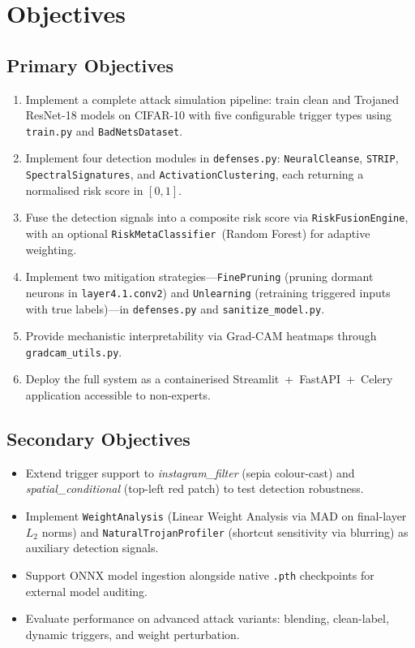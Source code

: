 \documentclass[12pt, letterpaper]{article}
\begin{document}
\section{Objectives}
\label{sec:objectives}

\subsection{Primary Objectives}

\begin{enumerate}
  \item Implement a complete attack simulation pipeline: train clean and
        Trojaned ResNet-18 models on CIFAR-10 with five configurable trigger
        types using \texttt{train.py} and \texttt{BadNetsDataset}.
  \item Implement four detection modules in \texttt{defenses.py}:
        \texttt{NeuralCleanse}, \texttt{STRIP}, \texttt{SpectralSignatures},
        and \texttt{ActivationClustering}, each returning a normalised risk
        score in $[0,1]$.
  \item Fuse the detection signals into a composite risk score
        via \texttt{RiskFusionEngine}, with an optional
        \texttt{RiskMetaClassifier}~(Random Forest) for adaptive weighting.
  \item Implement two mitigation strategies---\texttt{FinePruning}
        (pruning dormant neurons in \texttt{layer4.1.conv2}) and
        \texttt{Unlearning} (retraining triggered inputs with true labels)---in
        \texttt{defenses.py} and \texttt{sanitize\_model.py}.
  \item Provide mechanistic interpretability via Grad-CAM heatmaps
        through \texttt{gradcam\_utils.py}.
  \item Deploy the full system as a containerised Streamlit~+~FastAPI~+~Celery
        application accessible to non-experts.
\end{enumerate}

\subsection{Secondary Objectives}

\begin{itemize}
  \item Extend trigger support to \textit{instagram\_filter} (sepia
        colour-cast) and \textit{spatial\_conditional} (top-left red patch)
        to test detection robustness.
  \item Implement \texttt{WeightAnalysis} (Linear Weight Analysis via MAD on
        final-layer \(L_2\) norms) and \texttt{NaturalTrojanProfiler}
        (shortcut sensitivity via blurring) as auxiliary detection signals.
  \item Support ONNX model ingestion alongside native \texttt{.pth}
        checkpoints for external model auditing.
  \item Evaluate performance on advanced attack variants: blending,
        clean-label, dynamic triggers, and weight perturbation.
\end{itemize}
\end{document}
